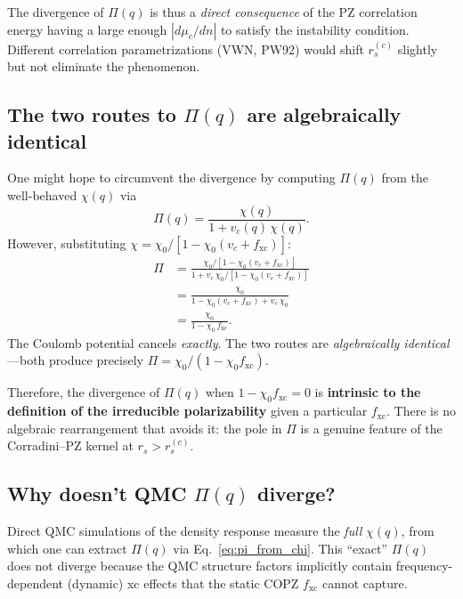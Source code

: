 \documentclass[aps,prb,twocolumn,superscriptaddress,floatfix]{revtex4-2}
\begin{document}
The divergence of $\Pi(q)$ is thus a \emph{direct consequence} of the PZ
correlation energy having a large enough $|d\mu_c/dn|$ to satisfy the
instability condition.  Different correlation parametrizations (VWN, PW92)
would shift $r_s^{(c)}$ slightly but not eliminate the phenomenon.

\subsection{The two routes to $\Pi(q)$ are algebraically identical}
\label{sec:equivalence}

One might hope to circumvent the divergence by computing $\Pi(q)$ from
the well-behaved $\chi(q)$ via
\begin{equation}
    \Pi(q) = \frac{\chi(q)}{1 + v_c(q)\,\chi(q)}.
    \label{eq:pi_from_chi}
\end{equation}
However, substituting $\chi = \chi_0/[1 - \chi_0(v_c + f_{\mathrm{xc}})]$:
\begin{align}
    \Pi & = \frac{\chi_0/[1-\chi_0(v_c+f_{\mathrm{xc}})]}
    {1 + v_c\,\chi_0/[1-\chi_0(v_c+f_{\mathrm{xc}})]} \nonumber \\
        & = \frac{\chi_0}
    {1 - \chi_0(v_c+f_{\mathrm{xc}}) + v_c\,\chi_0} \nonumber   \\
        & = \frac{\chi_0}{1 - \chi_0\, f_{\mathrm{xc}}}.
    \label{eq:equivalence}
\end{align}
The Coulomb potential cancels \emph{exactly}.  The two routes are
\emph{algebraically identical}---both produce precisely
$\Pi = \chi_0/(1 - \chi_0 f_{\mathrm{xc}})$.

Therefore, the divergence of $\Pi(q)$ when $1 - \chi_0 f_{\mathrm{xc}} = 0$
is \textbf{intrinsic to the definition of the irreducible polarizability}
given a particular $f_{\mathrm{xc}}$.  There is no algebraic rearrangement
that avoids it: the pole in $\Pi$ is a genuine feature of the
Corradini--PZ kernel at $r_s > r_s^{(c)}$.

\subsection{Why doesn't QMC $\Pi(q)$ diverge?}

Direct QMC simulations of the density response measure the \emph{full}
$\chi(q)$, from which one can extract $\Pi(q)$ via Eq.~\eqref{eq:pi_from_chi}.
This ``exact'' $\Pi(q)$ does not diverge because the QMC structure factors
implicitly contain frequency-dependent (dynamic) xc effects that the
static COPZ $f_{\mathrm{xc}}$ cannot capture.
\end{document}
